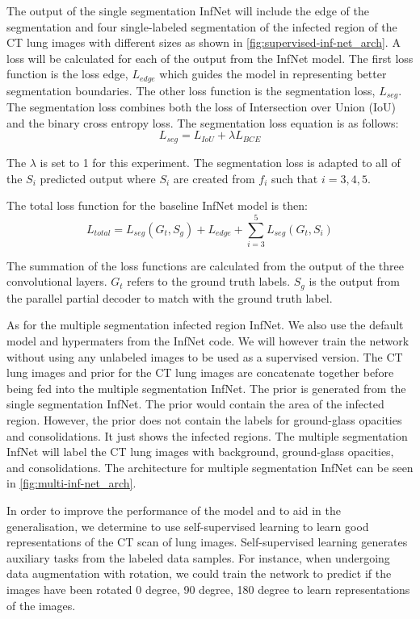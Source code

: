The output of the single segmentation InfNet will include the edge of the segmentation and four single-labeled segmentation of the infected region of the CT lung images with different sizes as shown in \ref{fig:supervised-inf-net_arch}. A loss will be calculated for each of the output from the InfNet model. The first loss function is the loss edge, $L_{edge}$ which guides the model in representing better segmentation boundaries. The other loss function is the segmentation loss, ${L_{seg}}$. The segmentation loss combines both the loss of Intersection over Union (IoU) and the binary cross entropy loss. The segmentation loss equation is as follows:
\begin{equation}
L_{seg} = L_{IoU} + \lambda L_{BCE}
\end{equation}

The $\lambda$ is set to 1 for this experiment. The segmentation loss is adapted to all of the ${S_i}$ predicted output where ${S_i}$ are created from $f_i$ such that $i={3,4,5}$. 

The total loss function for the baseline InfNet model is then:
\begin{equation}
L_{total} = L_{seg}(G_t, S_g) + L_{edge} + 	\sum_{i=3}^{5}L_{seg}(G_t, S_i)
\end{equation}

The summation of the loss functions are calculated from the output of the three convolutional layers. $G_t$ refers to the ground truth labels. $S_g$ is the output from the parallel partial decoder to match with the ground truth label.

As for the multiple segmentation infected region InfNet. We also use the default model and hypermaters from the InfNet code. We will however train the network without using any unlabeled images to be used as a supervised version. The CT lung images and prior for the CT lung images are concatenate together before being fed into the multiple segmentation InfNet. The prior is generated from the single segmentation InfNet. The prior would contain the area of the infected region. However, the prior does not contain the labels for ground-glass opacities and consolidations. It just shows the infected regions. The multiple segmentation InfNet will label the CT lung images with background, ground-glass opacities, and consolidations. The architecture for multiple segmentation InfNet can be seen in \ref{fig:multi-inf-net_arch}.

In order to improve the performance of the model and to aid in the generalisation, we  determine to use self-supervised learning to learn good representations of the CT scan of lung images. Self-supervised learning generates auxiliary tasks from the labeled data samples. For instance, when undergoing data augmentation with rotation, we could train the network to predict if the images have been rotated 0 degree, 90 degree, 180 degree to learn representations of the images. 



